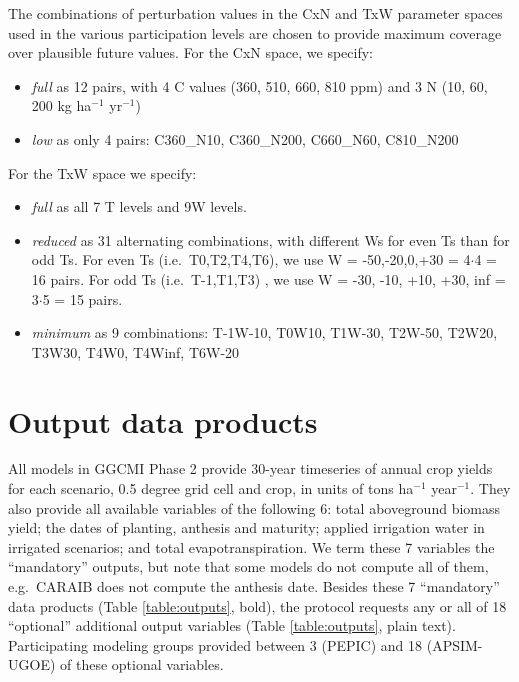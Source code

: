 \documentclass[gmd, manuscript]{copernicus} %
\begin{document}
The combinations of perturbation values in the CxN and TxW parameter spaces used in the various participation levels are chosen to provide maximum coverage over plausible future values. For the CxN space, we specify:
\begin{itemize}
  \item \textit{full} as 12 pairs, with 4 C values (360, 510, 660, 810 ppm) and 3 N (10, 60, 200 kg ha$^{-1}$ yr$^{-1}$)
  \item \textit{low} as only 4 pairs: C360\_N10, C360\_N200, C660\_N60, C810\_N200
\end{itemize}
    
For the TxW space we specify:
\begin{itemize}
  \item \textit{full} as all 7 T levels and 9W levels.
  \item \textit{reduced} as 31 alternating combinations, with different Ws for even Ts than for odd Ts. For even Ts (i.e.\ T0,T2,T4,T6), we use W = -50,-20,0,+30 = 4$\cdot$4 = 16 pairs. For odd Ts (i.e.\ T-1,T1,T3) , we use W = -30, -10, +10, +30, inf = 3$\cdot$5 = 15 pairs.
  \item \textit{minimum} as 9 combinations: T-1W-10, T0W10, T1W-30, T2W-50, T2W20, T3W30, T4W0, T4Winf, T6W-20
\end{itemize}

\section{Output data products}
All models in GGCMI Phase 2 provide 30-year timeseries of annual crop yields 
for each scenario, 0.5 degree grid cell and crop, in units of tons ha$^{-1}$ year$^{-1}$. They also provide all available variables of the following 6: total aboveground biomass yield; the dates of planting, anthesis and maturity; applied irrigation water in irrigated scenarios; and total evapotranspiration. 
We term these 7 variables the ``mandatory'' outputs, but note that some models do not compute all of them, e.g.\ CARAIB does not compute the anthesis date.
Besides these 7 ``mandatory'' data products (Table \ref{table:outputs}, bold), the protocol requests any or all of 18 ``optional'' additional output variables (Table \ref{table:outputs}, plain text).
Participating modeling groups provided between 3 (PEPIC) and 18 (APSIM-UGOE) of these optional variables. 
\end{document}
